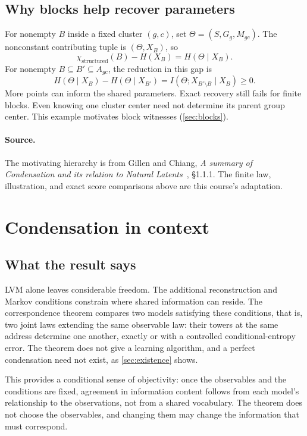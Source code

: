 \documentclass[11pt]{article}
\begin{document}
\subsection{Why blocks help recover parameters}
For nonempty $B$ inside a fixed cluster $(g,c)$, set $\Theta=(S,G_g,M_{gc})$. The
nonconstant contributing tuple is $(\Theta,X_B)$, so
\[
 \chi_{\mathrm{structured}}(B)-H(X_B)=H(\Theta\mid X_B).
\]
For nonempty $B\subseteq B'\subseteq A_{gc}$, the reduction in this gap is
\[
 H(\Theta\mid X_B)-H(\Theta\mid X_{B'})
 =I(\Theta;X_{B'\setminus B}\mid X_B)\ge0.
\]
More points can inform the shared parameters. Exact recovery still fails for
finite blocks. Even knowing one cluster center need not determine its parent
group center. This example motivates block witnesses (\cref{sec:blocks}).

\paragraph{Source.}
The motivating hierarchy is from Gillen and Chiang,
\emph{A summary of
Condensation and its relation to Natural Latents}~\citep{gillen2026summary}, \S1.1.1. The finite law,
illustration, and exact score comparisons above are this course's adaptation.

\section{Condensation in context}
\label{sec:context}
\subsection{What the result says}
LVM alone leaves considerable freedom. The additional reconstruction
and Markov conditions constrain where shared information can reside. The
correspondence theorem compares two models satisfying these conditions, that
is, two joint laws extending the same observable law: their towers at
the same address determine one another, exactly or with a controlled
conditional-entropy error. The theorem does not give a learning algorithm, and
a perfect condensation need not exist, as \cref{sec:existence} shows.

This provides a conditional sense of objectivity: once the observables and the
conditions are fixed, agreement in information content follows from each
model's relationship to the observations, not from a shared vocabulary. The
theorem does not choose the observables, and changing them may change the
information that must correspond.
\end{document}
